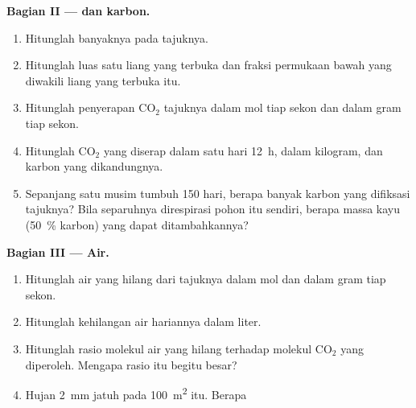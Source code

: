 \begin{problem}
\medskip
\noindent\textbf{Bagian II ---  dan karbon.}
\begin{enumerate}[resume]
  \item Hitunglah banyaknya  pada tajuknya.
  \item Hitunglah luas satu liang yang terbuka dan fraksi permukaan
        bawah  yang diwakili liang yang terbuka itu.
  \item Hitunglah penyerapan $\mathrm{CO_2}$ tajuknya dalam mol tiap
        sekon dan dalam gram tiap sekon.
  \item Hitunglah $\mathrm{CO_2}$ yang diserap dalam satu hari
        \qty{12}{h}, dalam kilogram, dan karbon yang dikandungnya.
  \item Sepanjang satu musim tumbuh \qty{150}{} hari, berapa banyak
        karbon yang difiksasi tajuknya? Bila separuhnya direspirasi
        pohon itu sendiri, berapa massa kayu (\qty{50}{\%} karbon) yang
        dapat ditambahkannya?
\end{enumerate}

\medskip
\noindent\textbf{Bagian III --- Air.}
\begin{enumerate}[resume]
  \item Hitunglah air yang hilang dari tajuknya dalam mol dan dalam
        gram tiap sekon.
  \item Hitunglah kehilangan air hariannya dalam liter.
  \item Hitunglah rasio molekul air yang hilang terhadap molekul
        $\mathrm{CO_2}$ yang diperoleh. Mengapa rasio itu begitu besar?
  \item Hujan \qty{2}{mm} jatuh pada \qty{100}{m^2} itu. Berapa
\end{enumerate}


\end{problem}
